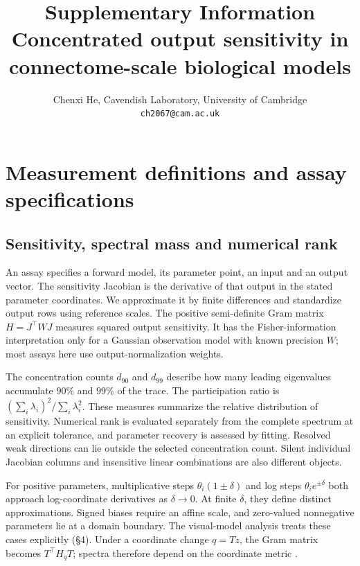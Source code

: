 \documentclass[11pt,letterpaper]{article}
\title{Supplementary Information \\ \large \textbf{Concentrated output sensitivity in connectome-scale biological models}}
\author{Chenxi He, Cavendish Laboratory, University of Cambridge \\ \texttt{ch2067@cam.ac.uk}}
\date{}
\begin{document}
\maketitle\tableofcontents

\section{Measurement definitions and assay specifications}
\subsection{Sensitivity, spectral mass and numerical rank}
An assay specifies a forward model, its parameter point, an input and an output vector. The sensitivity Jacobian is the derivative of that output in the stated parameter coordinates. We approximate it by finite differences and standardize output rows using reference scales. The positive semi-definite Gram matrix $H=J^{\top}WJ$ measures squared output sensitivity. It has the Fisher-information interpretation only for a Gaussian observation model with known precision $W$; most assays here use output-normalization weights.

The concentration counts $d_{90}$ and $d_{99}$ describe how many leading eigenvalues accumulate $90\%$ and $99\%$ of the trace. The participation ratio is $(\sum_i\lambda_i)^2/\sum_i\lambda_i^2$. These measures summarize the relative distribution of sensitivity. Numerical rank is evaluated separately from the complete spectrum at an explicit tolerance, and parameter recovery is assessed by fitting. Resolved weak directions can lie outside the selected concentration count. Silent individual Jacobian columns and insensitive linear combinations are also different objects.

For positive parameters, multiplicative steps $\theta_i(1\pm\delta)$ and log steps $\theta_i e^{\pm\delta}$ both approach log-coordinate derivatives as $\delta\to0$. At finite $\delta$, they define distinct approximations. Signed biases require an affine scale, and zero-valued nonnegative parameters lie at a domain boundary. The visual-model analysis treats these cases explicitly (\S4). Under a coordinate change $q=Tz$, the Gram matrix becomes $T^{\top}H_qT$; spectra therefore depend on the coordinate metric \citep{white2016limitations}.
\end{document}

